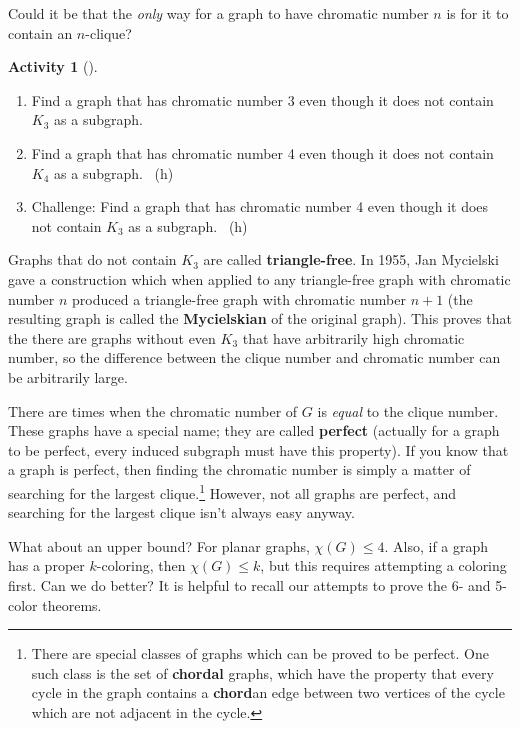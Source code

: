 \documentclass[10pt,]{book}
\newcommand{\terminology}[1]{\textbf{#1}}
\theoremstyle{plain}
\theoremstyle{definition}
\theoremstyle{definition}
\theoremstyle{definition}
\newtheorem{activity}[project]{Activity}
\numberwithin{equation}{chapter}
\begin{document}
\hypertarget{p-376}{}%
Could it be that the \emph{only} way for a graph to have chromatic number \(n\) is for it to contain an \(n\)-clique?%
\begin{activity}[]\label{activity-36}
\leavevmode%
\begin{enumerate}[font=\bfseries,label=(\alph*),ref=\alph*]
\item\label{task-55} \hypertarget{p-377}{}%
Find a graph that has chromatic number 3 even though it does not contain \(K_3\) as a subgraph.%
\item\label{task-56} \hypertarget{p-378}{}%
Find a graph that has chromatic number 4 even though it does not contain \(K_4\) as a subgraph.%
~{\tiny (h)}\item\label{task-57} \hypertarget{p-380}{}%
Challenge: Find a graph that has chromatic number 4 even though it does not contain \(K_3\) as a subgraph.%
~{\tiny (h)}\end{enumerate}
\end{activity}
\hypertarget{p-382}{}%
Graphs that do not contain \(K_3\) are called \terminology{triangle-free}.  In 1955, Jan Mycielski gave a construction which when applied to any triangle-free graph with chromatic number \(n\) produced a triangle-free graph with chromatic number \(n+1\) (the resulting graph is called the \terminology{Mycielskian} of the original graph).  This proves that the there are graphs without even \(K_3\) that have arbitrarily high chromatic number, so the difference between the clique number and chromatic number can be arbitrarily large.%
\par
\hypertarget{p-383}{}%
There are times when the chromatic number of \(G\) is \emph{equal} to the clique number. These graphs have a special name; they are called \terminology{perfect} (actually for a graph to be perfect, every induced subgraph must have this property). If you know that a graph is perfect, then finding the chromatic number is simply a matter of searching for the largest clique.\footnote{There are special classes of graphs which can be proved to be perfect.  One such class is the set of \terminology{chordal} graphs, which have the property that every cycle in the graph contains a \terminology{chord}\textemdash{}an edge between two vertices of the cycle which are not adjacent in the cycle.\label{fn-5}} However, not all graphs are perfect, and searching for the largest clique isn't always easy anyway.%
\par
\hypertarget{p-384}{}%
What about an upper bound?  For planar graphs, \(\chi(G) \le 4\).  Also, if a graph has a proper \(k\)-coloring, then \(\chi(G) \le k\), but this requires attempting a coloring first.  Can we do better? It is helpful to recall our attempts to prove the 6- and 5-color theorems.%
\end{document}
